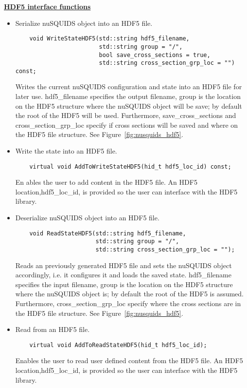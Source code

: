 \underline{\textbf{HDF5 interface functions}}
 
\begin{itemize}
  \item Serialize nuSQUIDS object into an HDF5 file.
  \begin{lstlisting}
    void WriteStateHDF5(std::string hdf5_filename,
                        std::string group = "/",
                        bool save_cross_sections = true, 
                        std::string cross_section_grp_loc = "") const;
  \end{lstlisting}
  Writes the current {\ttf nuSQUIDS} configuration and state into an HDF5 file
  for later use. {\ttf hdf5\_filename} specifies the output filename, {\ttf group} is the 
  location on the HDF5 structure where the {\ttf nuSQUIDS} object will be save; by default
  the root of the HDF5 will be used. Furthermore, {\ttf save\_cross\_sections} and {\ttf cross\_section\_grp\_loc}
  specify if cross sections will be saved and where on the HDF5 file structure. See Figure~\ref{fig:nusquids_hdf5}.
  \item Write the state into an HDF5 file.
  \begin{lstlisting}
    virtual void AddToWriteStateHDF5(hid_t hdf5_loc_id) const;
  \end{lstlisting}
  En ables the user to add content in the HDF5 file. An HDF5 location,{\ttf hdf5\_loc\_id}, is provided
  so the user can interface with the HDF5 library.
  \item Deserialize nuSQUIDS object into an HDF5 file.
  \begin{lstlisting}
    void ReadStateHDF5(std::string hdf5_filename,
                       std::string group = "/",
                       std::string cross_section_grp_loc = "");
  \end{lstlisting}
  Reads an previously generated HDF5 file and sets the {\ttf nuSQUIDS} object
  accordingly, i.e. it configures it and loads the saved state. {\ttf hdf5\_filename} specifies the input filename, {\ttf group} is the 
  location on the HDF5 structure where the {\ttf nuSQUIDS} object is; by default
  the root of the HDF5 is assumed. Furthermore, {\ttf cross\_section\_grp\_loc}
  specify where the cross sections are in the HDF5 file structure. See Figure~\ref{fig:nusquids_hdf5}.
  \item Read from an HDF5 file.
  \begin{lstlisting}
    virtual void AddToReadStateHDF5(hid_t hdf5_loc_id);
  \end{lstlisting}
  Enables the user to read user defined content from the HDF5 file. An HDF5 location,{\ttf hdf5\_loc\_id}, is provided
  so the user can interface with the HDF5 library.
\end{itemize}


